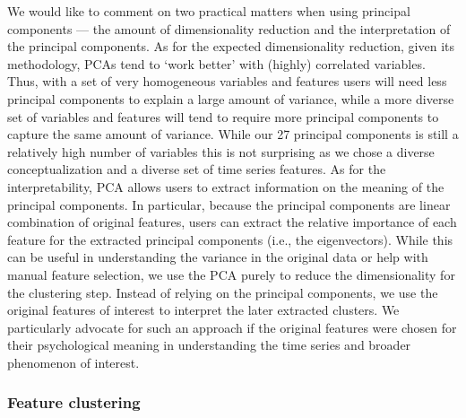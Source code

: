We would like to comment on two practical matters when using principal
components --- the amount of dimensionality reduction and the
interpretation of the principal components. As for the expected
dimensionality reduction, given its methodology, PCAs tend to `work
better' with (highly) correlated variables. Thus, with a set of very
homogeneous variables and features users will need less principal
components to explain a large amount of variance, while a more diverse
set of variables and features will tend to require more principal
components to capture the same amount of variance. While our 27
principal components is still a relatively high number of variables this
is not surprising as we chose a diverse conceptualization and a diverse
set of time series features. As for the interpretability, PCA allows
users to extract information on the meaning of the principal components.
In particular, because the principal components are linear combination
of original features, users can extract the relative importance of each
feature for the extracted principal components (i.e., the eigenvectors).
While this can be useful in understanding the variance in the original
data or help with manual feature selection, we use the PCA purely to
reduce the dimensionality for the clustering step. Instead of relying on
the principal components, we use the original features of interest to
interpret the later extracted clusters. We particularly advocate for
such an approach if the original features were chosen for their
psychological meaning in understanding the time series and broader
phenomenon of interest.

\subsubsection{Feature clustering}


